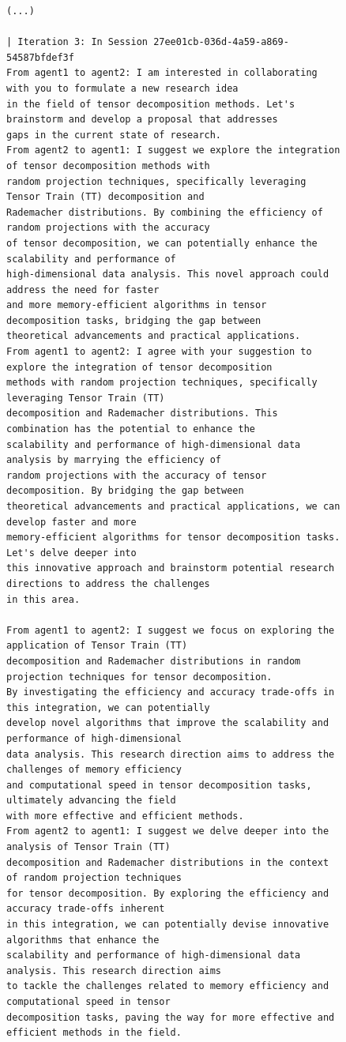 \begin{figure}[htbp]
\begin{tcolorbox}[
    title=\textbf{Good Communication Case \#1},
    colback=red!1!white,
    colframe=red!50!black,
    fonttitle=\bfseries
]
\begin{verbatim}
(...)

| Iteration 3: In Session 27ee01cb-036d-4a59-a869-54587bfdef3f
From agent1 to agent2: I am interested in collaborating with you to formulate a new research idea
in the field of tensor decomposition methods. Let's brainstorm and develop a proposal that addresses
gaps in the current state of research.
From agent2 to agent1: I suggest we explore the integration of tensor decomposition methods with
random projection techniques, specifically leveraging Tensor Train (TT) decomposition and
Rademacher distributions. By combining the efficiency of random projections with the accuracy
of tensor decomposition, we can potentially enhance the scalability and performance of
high-dimensional data analysis. This novel approach could address the need for faster
and more memory-efficient algorithms in tensor decomposition tasks, bridging the gap between
theoretical advancements and practical applications.
From agent1 to agent2: I agree with your suggestion to explore the integration of tensor decomposition
methods with random projection techniques, specifically leveraging Tensor Train (TT)
decomposition and Rademacher distributions. This combination has the potential to enhance the
scalability and performance of high-dimensional data analysis by marrying the efficiency of
random projections with the accuracy of tensor decomposition. By bridging the gap between
theoretical advancements and practical applications, we can develop faster and more
memory-efficient algorithms for tensor decomposition tasks. Let's delve deeper into
this innovative approach and brainstorm potential research directions to address the challenges
in this area.

From agent1 to agent2: I suggest we focus on exploring the application of Tensor Train (TT)
decomposition and Rademacher distributions in random projection techniques for tensor decomposition.
By investigating the efficiency and accuracy trade-offs in this integration, we can potentially
develop novel algorithms that improve the scalability and performance of high-dimensional
data analysis. This research direction aims to address the challenges of memory efficiency
and computational speed in tensor decomposition tasks, ultimately advancing the field
with more effective and efficient methods.
From agent2 to agent1: I suggest we delve deeper into the analysis of Tensor Train (TT)
decomposition and Rademacher distributions in the context of random projection techniques
for tensor decomposition. By exploring the efficiency and accuracy trade-offs inherent
in this integration, we can potentially devise innovative algorithms that enhance the
scalability and performance of high-dimensional data analysis. This research direction aims
to tackle the challenges related to memory efficiency and computational speed in tensor
decomposition tasks, paving the way for more effective and efficient methods in the field.
\end{verbatim}


\end{tcolorbox}
\end{figure}
